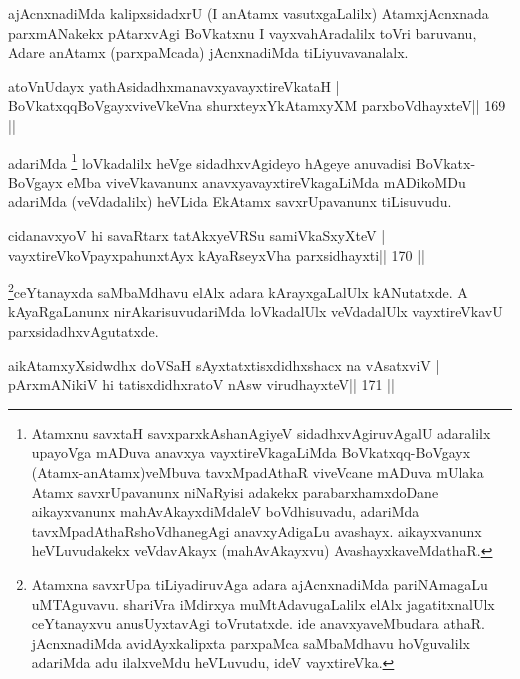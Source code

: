 \begin{artha}
ajAcnxnadiMda kalipxsidadxrU (I anAtamx vasutxgaLalilx) AtamxjAcnxnada  parxmANakekx pAtarxvAgi BoVkatxnu I vayxvahAradalilx toVri baruvanu, Adare anAtamx (parxpaMcada) jAcnxnadiMda tiLiyuvavanalalx.
\end{artha}

\begin{shl}
atoV\s nUdayx yathAsidadhxmanavxyavayxtireVkataH |
BoVkatxqqBoVgayxviveVkeVna shurxteyxYkAtamxyXM parxboVdhayxteV\hfill || 169 ||
\end{shl}

\begin{artha}
adariMda \footnote[10]{Atamxnu savxtaH savxparxkAshanAgiyeV  sidadhxvAgiruvAgalU adaralilx upayoVga mADuva anavxya vayxtireVkagaLiMda BoVkatxqq-BoVgayx (Atamx-anAtamx)veMbuva tavxMpadAthaR viveVcane mADuva mUlaka Atamx savxrUpavanunx niNaRyisi adakekx parabarxhamxdoDane aikayxvanunx mahAvAkayxdiMdaleV boVdhisuvadu, adariMda tavxMpadAthaRshoVdhanegAgi anavxyAdigaLu avashayx. aikayxvanunx heVLuvudakekx veVdavAkayx (mahAvAkayxvu) AvashayxkaveMdathaR.} loVkadalilx heVge sidadhxvAgideyo hAgeye anuvadisi BoVkatx- BoVgayx eMba viveVkavanunx anavxyavayxtireVkagaLiMda mADikoMDu adariMda (veVdadalilx) heVLida EkAtamx savxrUpavanunx tiLisuvudu.
\end{artha}


\begin{shl}
cidanavxyoV hi savaRtarx tatAkxyeVRSu samiVkaSxyXteV |
vayxtireVkoV\s payxpahunxtAyx kAyaRseyxVha parxsidhayxti\hfill || 170 ||
\end{shl}

\begin{artha}
\footnote[11]{Atamxna savxrUpa tiLiyadiruvAga adara ajAcnxnadiMda 
pariNAmagaLu uMTAguvavu. shariVra iMdirxya muMtAdavugaLalilx elAlx 
jagatitxnalUlx ceYtanayxvu anusUyxtavAgi toVrutatxde. ide 
anavxyaveMbudara athaR. jAcnxnadiMda avidAyxkalipxta parxpaMca 
saMbaMdhavu hoVguvalilx adariMda adu ilalxveMdu heVLuvudu, ideV vayxtireVka.}ceYtanayxda saMbaMdhavu elAlx adara kArayxgaLalUlx kANutatxde. A kAyaRgaLanunx nirAkarisuvudariMda loVkadalUlx veVdadalUlx vayxtireVkavU parxsidadhxvAgutatxde.
\end{artha}


\begin{shl}
aikAtamxyXsidwdhx doVSaH sAyxtatxtisxdidhxshacx na vAsatxviV |
pArxmANikiV hi tatisxdidhxratoV nAsw virudhayxteV\hfill || 171 ||
\end{shl}

